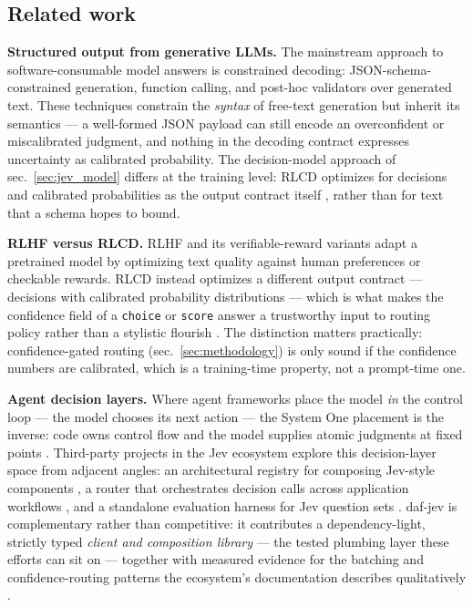 \documentclass[
  english,
]{article}
\begin{document}
\subsection{Related work}\label{related-work}

\textbf{Structured output from generative LLMs.} The mainstream approach
to software-consumable model answers is constrained decoding:
JSON-schema-constrained generation, function calling, and post-hoc
validators over generated text. These techniques constrain the
\emph{syntax} of free-text generation but inherit its semantics --- a
well-formed JSON payload can still encode an overconfident or
miscalibrated judgment, and nothing in the decoding contract expresses
uncertainty as calibrated probability. The decision-model approach of
sec.~\ref{sec:jev_model} differs at the training level: RLCD optimizes
for decisions and calibrated probabilities as the output contract itself
\citep{typesafe2026systemoneconcept}, rather than for text that a schema
hopes to bound.

\textbf{RLHF versus RLCD.} RLHF and its verifiable-reward variants adapt
a pretrained model by optimizing text quality against human preferences
or checkable rewards. RLCD instead optimizes a different output contract
--- decisions with calibrated probability distributions --- which is
what makes the confidence field of a \texttt{choice} or \texttt{score}
answer a trustworthy input to routing policy rather than a stylistic
flourish \citep{typesafe2026systemoneconcept, typesafe2026confidence}.
The distinction matters practically: confidence-gated routing
(sec.~\ref{sec:methodology}) is only sound if the confidence numbers are
calibrated, which is a training-time property, not a prompt-time one.

\textbf{Agent decision layers.} Where agent frameworks place the model
\emph{in} the control loop --- the model chooses its next action --- the
System One placement is the inverse: code owns control flow and the
model supplies atomic judgments at fixed points
\citep{typesafe2026systemone}. Third-party projects in the Jev ecosystem
explore this decision-layer space from adjacent angles: an architectural
registry for composing Jev-style components \citep{register2026jev}, a
router that orchestrates decision calls across application workflows
\citep{orcarouter2026jev}, and a standalone evaluation harness for Jev
question sets \citep{elsolitario2026jev}. daf-jev is complementary
rather than competitive: it contributes a dependency-light, strictly
typed \emph{client and composition library} --- the tested plumbing
layer these efforts can sit on --- together with measured evidence for
the batching and confidence-routing patterns the ecosystem's
documentation describes qualitatively \citep{typesafe2026patterns}.
\end{document}
